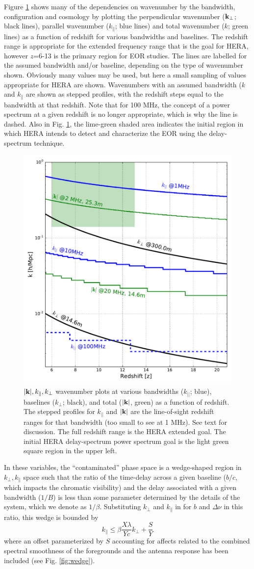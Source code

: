 \documentclass[preprint,11pt]{aastex}
\newcommand{\kvec}{{\bf k}}
\newcommand{\kpr}{{k_\perp}}
\newcommand{\kvpr}{{\kvec_\perp}}
\def\kperp{k_{\bot}}
\def\kpar{k_{\|}}
\begin{document}
Figure \ref{fig:kperf} shows many of the dependencies on wavenumber by the bandwidth, configuration and cosmology by plotting the perpendicular wavenumber ($\kvpr$; black lines), parallel wavenumber ($\kpar$; blue lines) and total wavenumber ($k$; green lines) as a function of redshift for various bandwidths and baselines.  The redshift range is appropriate for the extended frequency range that is the goal for HERA, however $z$=6-13 is the primary region for EOR studies.
The lines are labelled for the assumed bandwidth and/or baseline, depending on the type of wavenumber shown.  Obviously many values may be used, but here a small sampling of values appropriate for HERA are shown.    
Wavenumbers with an assumed bandwidth ($k$ and $\kpar$ are shown as stepped profiles, with the redshift steps equal to the bandwidth at that redshift.
Note that for 100 MHz, the concept of a power spectrum at a given redshift is no longer appropriate, which is why the line is dashed.
Also in Fig. \ref{fig:kperf}, the lime-green shaded area indicates the initial region in which HERA intends to detect and characterize the EOR using the delay-spectrum technique.


\begin{figure}[h!]
\centerline{
\includegraphics[width=.4\textwidth]{plots/kperf.pdf} 
}
\caption{\small $|\kvec |, \kpar, \kperp$ wavenumber plots at various bandwidths ($k_{||}$; blue), baselines ($\kperp$; black), and total ($|\kvec |$, green) as a function of redshift.  The stepped profiles for $k_{||}$ and $|\kvec |$ are the line-of-sight redshift ranges for that bandwidth (too small to see at 1 MHz).  See text for discussion.  The full redshift range is the HERA extended goal.  The initial HERA delay-spectrum power spectrum goal is the light green square region in the upper left.}
\label{fig:kperf}
\end{figure}


In these variables, the ``contaminated'' phase space is a wedge-shaped region in $\kpr, \kpar$ space such that the ratio of the time-delay across a given baseline ($b/c$,  which impacts the chromatic visibility) and the delay associated with a given bandwidth ($1/B$) is less than some parameter determined by the details of the system, which we denote as $1/\beta$.  Substituting $\kpr$ and $\kpar$ in for $b$ and $\Delta\nu$ in this ratio, this wedge is bounded by
\begin{equation}
\kpar \le \beta\frac{X\lambda}{Yc}\kpr + \frac{S}{Y}
\end{equation}
where an offset parameterized by $S$ accounting for affects related to the combined spectral smoothness of the foregrounds and the antenna response has been included (see Fig. \ref{fig:wedge}). 
\end{document}
